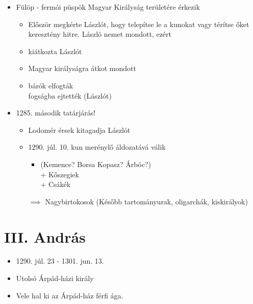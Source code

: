\documentclass{article}
\begin{document}
\begin{itemize}
    \item Fülöp - fermói püspök Magyar Királyság területére érkezik  
    \begin{itemize}
        \item Először megkérte Lászlót, hogy telepítse le a kunokat vagy térítse őket keresztény hitre. László nemet mondott, ezért
        \item kiátkozta Lászlót
        \item Magyar királyságra átkot mondott
        \item bárók elfogták \\ fogságba ejtették (Lászlót)
    \end{itemize}
    
    \item 1285. második tatárjárás! 
    \begin{itemize}
        \item Lodomér érsek kitagadja Lászlót
        \item 1290. júl. 10. kun merénylő áldozatává válik 
        \begin{itemize}
            \item (Kemence? Borsa Kopasz? Árbóc?) \\  + Kőszegiek \\ + Csákék
        \end{itemize} $\implies$ Nagybirtokosok (Később tartományurak, oligarchák, kiskirályok) %
    \end{itemize}
\end{itemize}

\section{III. András}
\begin{itemize}
    \item 1290. júl. 23 - 1301. jun. 13.
    \item Utolsó Árpád-házi király
    \item Vele hal ki az Árpád-ház férfi ága.
\end{itemize}
\end{document}
